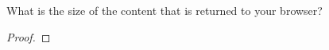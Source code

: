 \documentclass[../../main.tex]{subfiles}
\begin{document}
\begin{wts}
What is the size of the content that is returned to your browser?  
\end{wts}
\begin{proof}

\end{proof}
\end{document}
